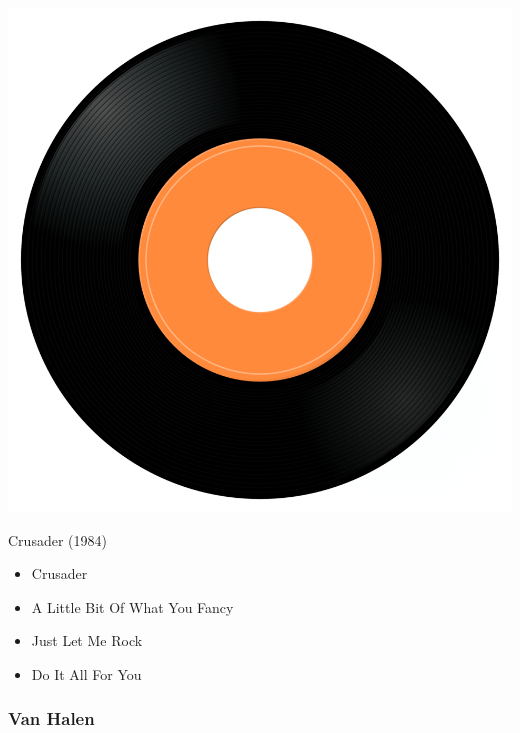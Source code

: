 \begin{minipage}[t]{0.25\textwidth}
\captionsetup{type=figure}
\includegraphics[width=\textwidth]{Images/cover.png}
\caption*{Crusader (1984)}
\end{minipage}
\begin{minipage}[t]{0.25\textwidth}\vspace{0pt}
\begin{itemize}[nosep,leftmargin=1em,labelwidth=*,align=left]
	\setlength{\itemsep}{0pt}
	\item Crusader
	\item A Little Bit Of What You Fancy
	\item Just Let Me Rock
	\item Do It All For You
\end{itemize}
\end{minipage}

\subsubsection{Van Halen}

